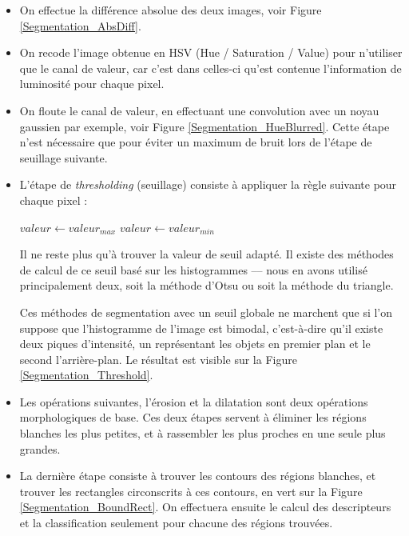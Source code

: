 \begin{itemize}
    \item On effectue la différence absolue des deux images, voir Figure \ref{Segmentation_AbsDiff}.
    \item On recode l’image obtenue en HSV (Hue / Saturation / Value) pour n’utiliser que le canal de valeur, car c’est dans celles-ci qu’est contenue l’information de luminosité pour chaque pixel.
    \item On floute le canal de valeur, en effectuant une convolution avec un noyau gaussien par exemple, voir Figure \ref{Segmentation_HueBlurred}.
    Cette étape n’est nécessaire que pour éviter un maximum de bruit lors de l’étape de seuillage suivante.
    \item L’étape de \emph{thresholding} (seuillage) consiste à appliquer la règle suivante pour chaque pixel :

\begin{absolutelynopagebreak}
    \begin{algorithmic}
        \State $valeur \gets valeur_{max}$
    \Else
            \State $valeur\gets valeur_{min}$
    \EndIf
    \end{algorithmic}
\end{absolutelynopagebreak}

    Il ne reste plus qu’à trouver la valeur de seuil adapté.
    Il existe des méthodes de calcul de ce seuil basé sur les histogrammes –-- nous en avons utilisé principalement deux, soit la méthode d’Otsu \cite{otsu1975threshold} ou soit la méthode du triangle.
    
    Ces méthodes de segmentation avec un seuil globale ne marchent que si l’on suppose que l’histogramme de l’image est bimodal, c’est-à-dire qu’il existe deux piques d’intensité, un représentant les objets en premier plan et le second l’arrière-plan. Le résultat est visible sur la Figure \ref{Segmentation_Threshold}.
    \item Les opérations suivantes, l’érosion et la dilatation sont deux opérations morphologiques de base.
    Ces deux étapes servent à éliminer les régions blanches les plus petites, et à rassembler les plus proches en une seule plus grandes.
    \item La dernière étape consiste à trouver les contours des régions blanches, et trouver les rectangles circonscrits à ces contours, en vert sur la Figure \ref{Segmentation_BoundRect}.
    On effectuera ensuite le calcul des descripteurs et la classification seulement pour chacune des régions trouvées.
\end{itemize}
    
